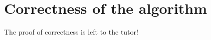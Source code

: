 \documentclass[english]{scrartcl}
\begin{document}
\section{Correctness of the algorithm}
\label{sec:correctness}
\begin{huge}
    The proof of correctness is left to the tutor!
\end{huge}





\clearpage


\end{document}
